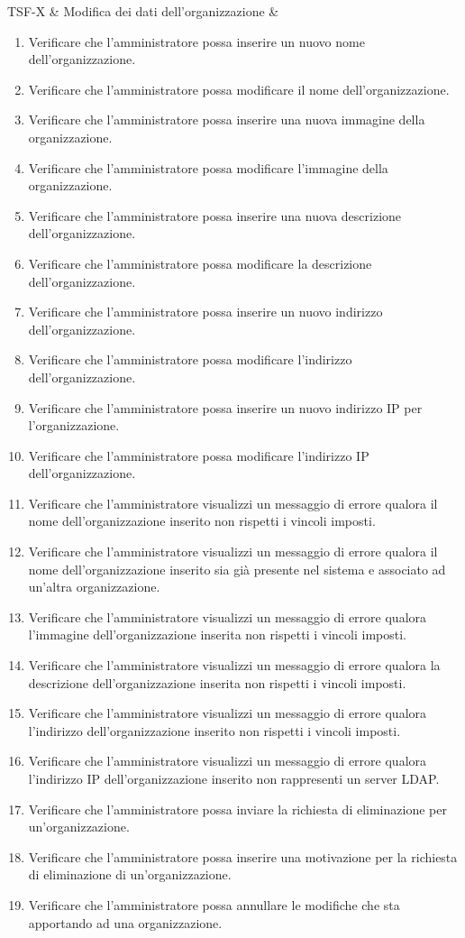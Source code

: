 TSF-X & Modifica dei dati dell'organizzazione & \begin{enumerate}
\item Verificare che l'amministratore possa inserire un nuovo nome dell'organizzazione.
\item Verificare che l'amministratore possa modificare il nome dell'organizzazione.
\item Verificare che l'amministratore possa inserire una nuova immagine della organizzazione.
\item Verificare che l'amministratore possa modificare l'immagine della organizzazione.
\item Verificare che l'amministratore possa inserire una nuova descrizione dell’organizzazione.
\item Verificare che l'amministratore possa modificare la descrizione dell’organizzazione.
\item Verificare che l'amministratore possa inserire un nuovo indirizzo dell’organizzazione.
\item Verificare che l'amministratore possa modificare l'indirizzo dell’organizzazione.
\item Verificare che l'amministratore possa inserire un nuovo indirizzo IP per l'organizzazione.
\item Verificare che l'amministratore possa modificare l'indirizzo IP dell'organizzazione.
\item Verificare che l'amministratore visualizzi un messaggio di errore qualora il nome dell'organizzazione inserito non rispetti i vincoli imposti.
\item Verificare che l'amministratore visualizzi un messaggio di errore qualora il nome dell'organizzazione inserito sia già presente nel sistema e associato ad un'altra organizzazione.
\item Verificare che l'amministratore visualizzi un messaggio di errore qualora l'immagine dell'organizzazione inserita non rispetti i vincoli imposti.
\item Verificare che l'amministratore visualizzi un messaggio di errore qualora la descrizione dell'organizzazione inserita non rispetti i vincoli imposti.
\item Verificare che l'amministratore visualizzi un messaggio di errore qualora l'indirizzo dell'organizzazione inserito non rispetti i vincoli imposti.
\item Verificare che l'amministratore visualizzi un messaggio di errore qualora l'indirizzo IP dell'organizzazione inserito non rappresenti un server LDAP.
\item Verificare che l'amministratore possa inviare la richiesta di eliminazione per un'organizzazione.
\item Verificare che l'amministratore possa inserire una motivazione per la richiesta di eliminazione di un'organizzazione.
\item Verificare che l'amministratore possa annullare le modifiche che sta apportando ad una organizzazione.
\end{enumerate} \\
